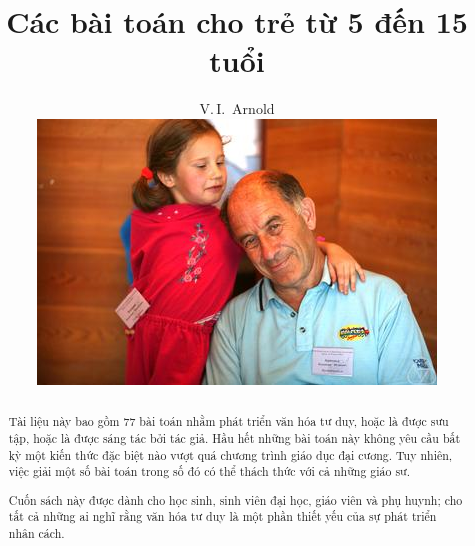 
\setdefaultlanguage{vietnamese}

\def\it{\begin{itemize}}
\def\hit{\end{itemize}}
\def\dlim{\displaystyle\lim}
\def\csd{\underset}
\def\cl{\centerline }
\newcommand{\ktt}{\not \exists}
\renewcommand{\tt}{\exists}
\newcommand{\vc}{\infty}
\newcommand{\vm}{\forall}
\newcommand{\tru}{\setminus}
\newcommand{\td}{\Longleftrightarrow}
\newcommand{\sr}{\longrightarrow}
\newcommand{\Sr}{\Longrightarrow}
\def\mtnguoc{\Longleftarrow}
\newcommand{\ps}{\dfrac}
\newcommand{\can}{\sqrt}
\newcommand{\mtn}{\rightarrow}
\newcommand{\gd}{\underline}
\newcommand{\gt}{\overline}
\newcommand{\mtt}{\overrightarrow}
\newcommand{\omg}{\omega}
\newcommand{\seq}[1]{\left<#1\right>}
\renewcommand{\figurename}{Hình}
\def\r{\Bbb R}
\def\b{\Bbb B}
\def\s{\Bbb S}
\def\e{\Bbb E}
\def\n{\Bbb N}
\def\q{\Bbb Q}
\def\c{\Bbb C}
\def\p{\Bbb P }
\def\z{\Bbb Z}
\def\f{\Bbb F}
\def\k{\Bbb K}
\def\a{\Bbb A}

\title{Các bài toán cho trẻ từ 5 đến 15 tuổi }

\author{V.\,I.~Arnold
\vspace*{2cm}\\
\includegraphics[width=\linewidth]{photo-arnold_small}
}
\date{}


\maketitle
\thispagestyle{empty}
\cleardoublepage 
\setcounter{page}{1}
\begin{abstract}
	Tài liệu này bao gồm 77 bài toán nhằm phát triển văn hóa tư duy, hoặc là được sưu tập, hoặc là được sáng tác bởi tác giả. Hầu hết những bài toán này không yêu cầu bất kỳ một kiến thức đặc biệt nào vượt quá chương trình giáo dục đại cương.  Tuy nhiên, việc giải  một số bài toán trong số đó có thể  thách thức  với cả những giáo sư.

	Cuốn sách này được dành cho học sinh, sinh viên đại học, giáo viên và phụ huynh; cho tất cả những ai nghĩ rằng văn hóa tư duy là một phần thiết yếu của sự phát triển nhân cách.
\end{abstract}

